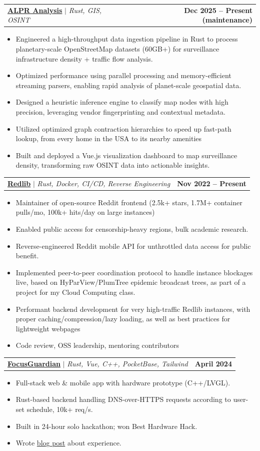 \documentclass[letterpaper, 11pt]{article}
\makeatletter
\newcommand{\resumeItem}[1]{ \item\small{ {#1 \vspace{-2pt}} } }
\newcommand{\resumeProjectHeading}[2]{ \item
\begin{tabular*}{1.0\textwidth}{l@{\extracolsep{\fill}}r}
	\small{#1} & \textbf{\small #2} \\
\end{tabular*}
\vspace{-10pt}
}
\newcommand{\resumeItemListStart}{\vspace{-6pt}\begin{itemize}}
\newcommand{\resumeItemListEnd}{\end{itemize}
\vspace{-6pt}}
\makeatother
\begin{document}
    \resumeProjectHeading {\href{https://alpranalysis.com/}{\textbf{ALPR Analysis}} $|$ \emph{Rust, GIS, OSINT}}{Dec 2025 -- Present (maintenance)}
    \resumeItemListStart
        \resumeItem{Engineered a high-throughput data ingestion pipeline in Rust to process planetary-scale OpenStreetMap datasets (60GB+) for surveillance infrastructure density + traffic flow analysis.}
        \resumeItem{Optimized performance using parallel processing and memory-efficient streaming parsers, enabling rapid analysis of planet-scale geospatial data.}
        \resumeItem{Designed a heuristic inference engine to classify map nodes with high precision, leveraging vendor fingerprinting and contextual metadata.}
        \resumeItem{Utilized optimized graph contraction hierarchies to speed up fast-path lookup, from every home in the USA to its nearby amenities}
        \resumeItem{Built and deployed a Vue.js visualization dashboard to map surveillance density, transforming raw OSINT data into actionable insights.}
    \resumeItemListEnd


	\resumeProjectHeading {\href{https://github.com/redlib-org/redlib}{\textbf{Redlib}} $|$ \emph{Rust, Docker, CI/CD, Reverse Engineering}}{Nov 2022 -- Present}
	\resumeItemListStart
    \resumeItem{Maintainer of open-source Reddit frontend (2.5k+ stars, 1.7M+ container pulls/mo, 100k+ hits/day on large instances)}
	\resumeItem{Enabled public access for censorship-heavy regions, bulk academic research.}
	\resumeItem{Reverse-engineered Reddit mobile API for unthrottled data access for public benefit.}
	\resumeItem{Implemented peer-to-peer coordination protocol to handle instance blockages live, based on HyParView/PlumTree epidemic broadcast trees, as part of a project for my Cloud Computing class.}
	\resumeItem{Performant backend development for very high-traffic Redlib instances, with proper caching/compression/lazy loading, as well as best practices for lightweight webpages}
    \resumeItem{Code review, OSS leadership, mentoring contributors}
	\resumeItemListEnd

	\resumeProjectHeading {\href{https://focusguardian.org}{\textbf{FocusGuardian}} $|$ \emph{Rust, Vue, C++, PocketBase, Tailwind}}{April 2024}
	\resumeItemListStart \resumeItem{Full-stack web \& mobile app with hardware prototype (C++/LVGL).}
	\resumeItem{Rust-based backend handling DNS-over-HTTPS requests according to user-set schedule, 10k+ req/s.}
	\resumeItem{Built in 24-hour solo hackathon; won Best Hardware Hack.} \resumeItem{Wrote \href{https://matthew.science/posts/focusguardian/}{blog post} about experience.}
	\resumeItemListEnd
\end{document}
